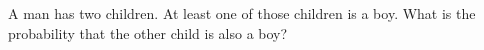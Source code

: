 \documentclass{ximera}
\begin{document}
\begin{question}
A man has two children. At least one of those children is a boy. What is the probability that the other child is also a boy?
  \begin{solution}
    \begin{multiple-choice}
    \end{multiple-choice}
  \end{solution}
\end{question}
\end{document}
